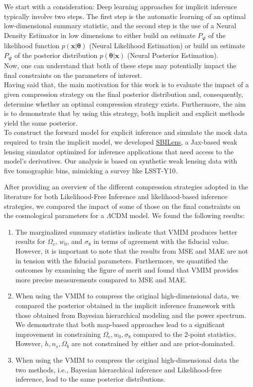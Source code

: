 \documentclass{aa}
\begin{document}
We start with a consideration: Deep learning approaches for implicit inference typically involve two steps. The first step is the automatic learning of an optimal low-dimensional summary statistic, and the second step is the use of a Neural Density Estimator in low dimensions to either build an estimate $P_{\bm{\varphi}}$ of the likelihood function $p(\bm{x}|\bm{\theta})$ (Neural Likelihood Estimation) or build an estimate $P_{\bm{\varphi}}$ of the posterior distribution $p(\bm{\theta}|\bm{x})$ (Neural Posterior Estimation). \\
Now, one can understand that both of these steps may potentially impact the final constraints on the parameters of interest. \\
Having said that, the main motivation for this work is to evaluate the impact of a given compression strategy on the final posterior distribution and, consequently, determine whether an optimal compression strategy exists. Furthermore, the aim is to demonstrate that by using this strategy, both implicit and explicit methods yield the same posterior. \\
To construct the forward model for explicit inference and simulate the mock data required to train the implicit model, we developed \href{https://github.com/DifferentiableUniverseInitiative/sbi_lens}{\url{SBILens}}, a Jax-based weak lensing simulator optimized for inference applications that need access to the model's derivatives. Our analysis is based on synthetic weak lensing data with five tomographic bins, mimicking a survey like LSST-Y10.


After providing an overview of the different compression strategies adopted in the literature for both Likelihood-Free Inference and likelihood-based inference strategies, we compared the impact of some of those on the final constraints on the cosmological parameters for a $\Lambda$CDM model. 
We found the following results:
\begin{enumerate}
    \item The marginalized summary statistics indicate that VMIM produces better results for $\Omega_c$, $w_0$, and $\sigma_8$ in terms of agreement with the fiducial value. However, it is important to note that the results from MSE and MAE are not in tension with the fiducial parameters.
    Furthermore, we quantified the outcomes by examining the figure of merit and found that VMIM provides more precise measurements compared to MSE and MAE.
    \item When using the VMIM to compress the original high-dimensional data, we compared the posterior obtained in the implicit inference framework with those obtained from Bayesian hierarchical modeling and the power spectrum. We demonstrate that both map-based approaches lead to a significant improvement in constraining $\Omega_c, w_0, \sigma_8$ compared to the 2-point statistics. However, $h, n_s, \Omega_b$ are not constrained by either and are prior-dominated.
    \item When using the VMIM to compress the original high-dimensional data the two methods, i.e., Bayesian hierarchical inference and Likelihood-free inference, lead to the same posterior distributions. 
\end{enumerate}
\end{document}
